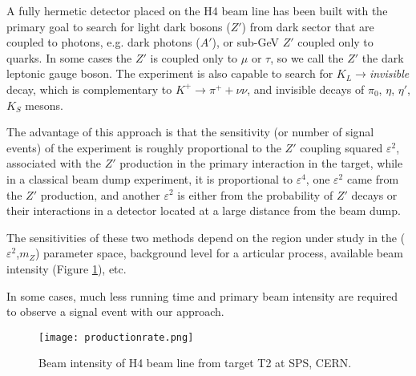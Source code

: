 A fully hermetic detector placed on the H4 beam line has been built with the primary goal to search for light dark
bosons ($Z'$) from dark sector that are coupled to photons, e.g. dark photons ($A'$), or sub-GeV $Z'$ coupled only to
quarks. In some cases the $Z'$ is coupled only to $\mu$ or $\tau$, so we call the $Z'$ the dark leptonic gauge boson.
The experiment is also capable to search for $K_L \rightarrow ${\it invisible} decay, which is complementary to
$K^+\rightarrow \pi^+ + \nu \nu$, and invisible decays of $\pi_0$, $\eta$, $\eta'$, $K_S$ mesons.\par

The advantage of this approach is that the sensitivity (or number of signal events) of the experiment is roughly
proportional to the $Z'$ coupling squared $\varepsilon^2$, associated with the $Z'$ production in the primary interaction
in the target, while in a classical beam dump experiment, it is proportional to $\varepsilon^4$, one $\varepsilon^2$
came from the $Z'$ production, and another $\varepsilon^2$ is either from the probability of $Z'$ decays or their
interactions in a detector located at a large distance from the beam dump.\par

The sensitivities of these two methods depend on the region under study in the ($\varepsilon^2$,$m_Z$) parameter space,
background level for a articular process, available beam intensity (Figure \ref{fig:prodrate}), etc.\par

In some cases, much less running time and primary beam intensity are required to observe a signal event with our
approach.\par


\begin{figure}[ht]
	\hspace*{\fill}
	\centering
	\texttt{[image: productionrate.png]}
	\hspace*{\fill}
	\caption{Beam intensity of H4 beam line from target T2 at SPS, CERN.}
	\label{fig:prodrate}
\end{figure}

